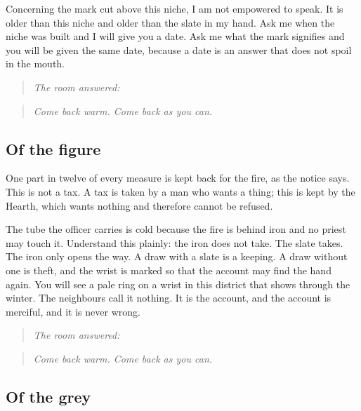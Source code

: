 \documentclass{design/chronicle}
\begin{document}
Concerning the mark cut above this niche, I am not empowered to speak. It is older than this niche and older than the slate in my hand. Ask me when the niche was built and I will give you a date. Ask me what the mark signifies and you will be given the same date, because a date is an answer that does not spoil in the mouth.

\begin{quote}\itshape \emph{The room answered:}\end{quote}

\begin{quote}\itshape \end{quote}

\begin{quote}\itshape Come back warm. Come back as you can.\end{quote}

\subsection*{Of the figure}

One part in twelve of every measure is kept back for the fire, as the notice says. This is not a tax. A tax is taken by a man who wants a thing; this is kept by the Hearth, which wants nothing and therefore cannot be refused.

The tube the officer carries is cold because the fire is behind iron and no priest may touch it. Understand this plainly: the iron does not take. The slate takes. The iron only opens the way. A draw with a slate is a keeping. A draw without one is theft, and the wrist is marked so that the account may find the hand again. You will see a pale ring on a wrist in this district that shows through the winter. The neighbours call it nothing. It is the account, and the account is merciful, and it is never wrong.

\begin{quote}\itshape \emph{The room answered:}\end{quote}

\begin{quote}\itshape \end{quote}

\begin{quote}\itshape Come back warm. Come back as you can.\end{quote}

\subsection*{Of the grey}
\end{document}
